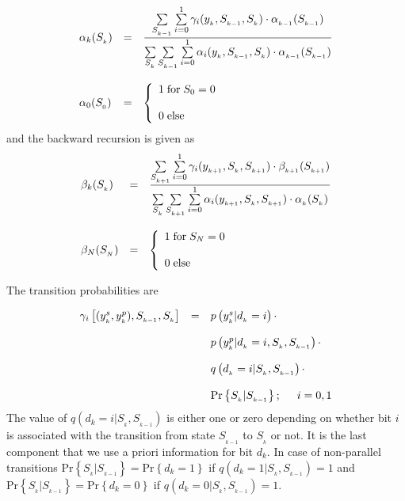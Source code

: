 \begin{eqnarray}
\begin{array}{lll}
\alpha_{k}(S_{_k})&=&\frac{\hbox{$\sum\limits_{S_{_{k-1}}}\sum\limits_{i=0}^1 \gamma_i (y_{_k},S_{_{k-1}},S_{_k})\cdot \alpha_{_{k-1}}(S_{_{k-1}}) $}}{\hbox{$\sum\limits_{S_{_k}}\sum\limits_{S_{_{k-1}}}\sum\limits_{i=0}^1 \alpha_i(y_{_k},S_{_{k-1}},S_{_k})\cdot \alpha_{_{k-1}}(S_{_{k-1}})$}} \\ \\
\alpha_0(S_{_0})&=&\left \{
\begin{array} {lll}
1\;\mathrm{for}\;S_0=0\\ \\
0\;\mathrm{else}  
\end{array}
\right.
\end{array}
\end{eqnarray}
and the backward recursion is given as
\begin{eqnarray}
\begin{array}{lll}
\beta_{k}(S_{_k})&=&\frac{\hbox{$\sum\limits_{S_{_{k+1}}}\sum\limits_{i=0}^1 \gamma_i (y_{_{k+1}},S_{_{k}},S_{_{k+1}})\cdot \beta_{_{k+1}}(S_{_{k+1}}) $}}{\hbox{$\sum\limits_{S_{_k}}\sum\limits_{S_{_{k+1}}}\sum\limits_{i=0}^1 \alpha_i(y_{_{k+1}},S_{_{k}},S_{_{k+1}})\cdot \alpha_{_{k}}(S_{_{k}})$}} \\ \\
\beta_N(S_{_N})&=&\left \{
\begin{array} {lll}
1\;\mathrm{for}\;S_N=0\\ \\
0\;\mathrm{else}  
\end{array}
\right.
\end{array}
\end{eqnarray}

The transition probabilities are

\begin{eqnarray}
\begin{array}{lll}
\gamma_{i}\left [ (y_{_{k}}^{s},y_{_{k}}^{p}),S_{_{k-1}},S_{_{k}} \right ]&=&p\left(y_{_{k}}^{s}\vert d_{_{k}}=i\right)\cdot\\ \\
&& p\left( y_{_{k}}^{p}\vert d_{_{k}}=i,S_{_{k}},S_{_{k-1}} \right)\cdot \\ \\
&&q\left ( d_{_{k}}=i\vert S_{_{k}},S_{_{k-1}} \right )\cdot \\ \\
&&\mathrm{Pr}\left\{S_{_{k}}\vert S_{_{k-1}}\right\};\hspace{5mm}i=0,1
\end{array}
\end{eqnarray}
The value of $q(d_k=i\vert S_{_{k}},S_{_{k-1}})$ is either one or zero depending on whether bit $i$ is associated with the transition from state $S_{_{k-1}}$ to $S_{_{k}}$ or not. It is the last component that we use a priori information for bit $d_k$. In case of non-parallel transitions $\mathrm{Pr}\left\{ S_{_{k}} \vert S_{_{k-1}} \right \} = \mathrm{Pr} \left \{ d_k=1 \right\}$ if $q(d_k=1\vert S_{_{k}},S_{_{k-1}})=1$ and $\mathrm{Pr} \left \{ S_{_{k}} \vert S_{_{k-1}} \right \}=\mathrm{Pr} \left \{d_k=0 \right\}$ if $q(d_k=0\vert S_{_{k}},S_{_{k-1}})=1$.


